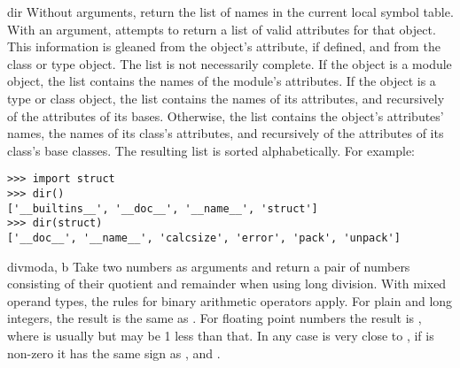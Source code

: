 \begin{funcdesc}{dir}{}
  Without arguments, return the list of names in the current local
  symbol table.  With an argument, attempts to return a list of valid
  attributes for that object.  This information is gleaned from the
  object's  attribute, if defined, and from the class
  or type object.  The list is not necessarily complete.
  If the object is a module object, the list contains the names of the
  module's attributes.
  If the object is a type or class object,
  the list contains the names of its attributes,
  and recursively of the attributes of its bases.
  Otherwise, the list contains the object's attributes' names,
  the names of its class's attributes,
  and recursively of the attributes of its class's base classes.
  The resulting list is sorted alphabetically.
  For example:

\begin{verbatim}
>>> import struct
>>> dir()
['__builtins__', '__doc__', '__name__', 'struct']
>>> dir(struct)
['__doc__', '__name__', 'calcsize', 'error', 'pack', 'unpack']
\end{verbatim}

\end{funcdesc}

\begin{funcdesc}{divmod}{a, b}
  Take two numbers as arguments and return a pair of numbers consisting
  of their quotient and remainder when using long division.  With mixed
  operand types, the rules for binary arithmetic operators apply.  For
  plain and long integers, the result is the same as
  .
  For floating point numbers the result is , where  is usually  but may be 1 less than that.  In any case  is very close to , if
   is non-zero it has the same sign as
  , and .
\end{funcdesc}

